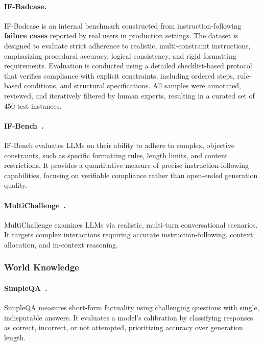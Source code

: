 \paragraph{IF-Badcase.} IF-Badcase is an internal benchmark constructed from instruction-following \textbf{failure cases} reported by real users in production settings. The dataset is designed to evaluate strict adherence to realistic, multi-constraint instructions, emphasizing procedural accuracy, logical consistency, and rigid formatting requirements.
Evaluation is conducted using a detailed checklist-based protocol that verifies compliance with explicit constraints, including ordered steps, rule-based conditions, and structural specifications. All samples were annotated, reviewed, and iteratively filtered by human experts, resulting in a curated set of 450 test instances.

\paragraph{IF-Bench~\citep{ifbench}.} IF-Bench evaluates LLMs on their ability to adhere to complex, objective constraints, such as specific formatting rules, length limits, and content restrictions. It provides a quantitative measure of precise instruction-following capabilities, focusing on verifiable compliance rather than open-ended generation quality.

\paragraph{MultiChallenge~\citep{multichallenge}.} MultiChallenge examines LLMs via realistic, multi-turn conversational scenarios. It targets complex interactions requiring accurate instruction-following, context allocation, and in-context reasoning.


\subsubsection{World Knowledge}

\paragraph{SimpleQA~\citep{simpleQA}.} SimpleQA measures short-form factuality using challenging questions with single, indisputable answers. It evaluates a model's calibration by classifying responses as correct, incorrect, or not attempted, prioritizing accuracy over generation length.

